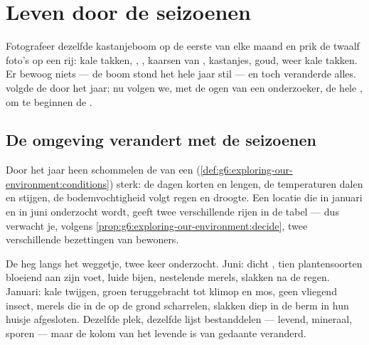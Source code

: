 \chapter{Leven door de seizoenen}\label{ch:g6:life-through-seasons}

Fotografeer dezelfde kastanjeboom op de eerste van elke maand en prik de
twaalf foto's op een rij: kale takken, , , kaarsen van
, kastanjes, goud, weer kale takken. Er bewoog niets --- de boom
stond het hele jaar stil --- en toch veranderde alles.
 volgde de  door het jaar; nu
volgen we, met de ogen van een onderzoeker, de hele , om te
beginnen de .

\section{De omgeving verandert met de seizoenen}

\begin{proposition}\label{prop:g6:life-through-seasons:conditions}
Door het jaar heen schommelen de  van een 
(\cref{def:g6:exploring-our-environment:conditions}) sterk: de dagen
korten en lengen, de temperaturen dalen en stijgen, de bodemvochtigheid
volgt regen en droogte. Een locatie die in januari en in juni onderzocht
wordt, geeft twee verschillende rijen in de tabel --- dus verwacht je,
volgens \cref{prop:g6:exploring-our-environment:decide}, twee
verschillende bezettingen van bewoners.
\end{proposition}
\admitted

\begin{example}\label{ex:g6:life-through-seasons:hedge}
De heg langs het weggetje, twee keer onderzocht. Juni: dicht , tien
plantensoorten bloeiend aan zijn voet, luide bijen, nestelende merels,
slakken na de regen. Januari: kale twijgen, groen teruggebracht tot
klimop en mos, geen vliegend insect, merels die in de  op de
grond scharrelen, slakken diep in de berm in hun huisje afgesloten.
Dezelfde plek, dezelfde lijst bestanddelen --- levend, mineraal, sporen
--- maar de kolom van het levende is van gedaante veranderd.
\end{example}

